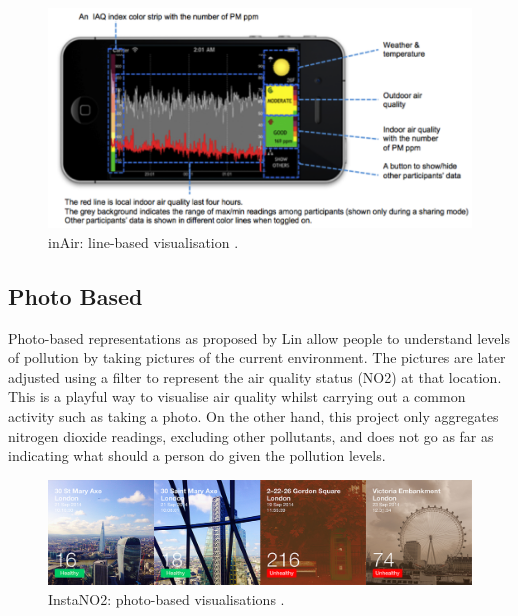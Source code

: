 \begin{figure}[H]
\begin{adjustbox}{width=1\textwidth,center=\textwidth}
  \centering
  \includegraphics[scale=1]{images/InAir.png}
\end{adjustbox}
  \caption[inAir project: line-based visualisations]{inAir: line-based visualisation \cite{Kim2013}.}
  \label{fig:line_based_inAir}
\end{figure}


\subsection{Photo Based}
Photo-based representations as proposed by Lin \cite{Lin2014} allow people to understand levels of pollution by taking pictures of the current environment. The pictures are later adjusted using a filter to represent the air quality status (NO2) at that location. This is a playful way to visualise air quality whilst carrying out a common activity such as taking a photo. On the other hand, this project only aggregates nitrogen dioxide readings, excluding other pollutants, and does not go as far as indicating what should a person do given the pollution levels.

\begin{figure}[H]
\begin{adjustbox}{width=.8\textwidth,center=\textwidth}
  \centering
  \includegraphics[scale=.4]{images/instaNO2.jpg}
\end{adjustbox}
  \caption[InstaNO2 project: photo-based visualisations]{InstaNO2: photo-based visualisations \cite{Lin2014}.}
  \label{fig:photo_based_instaNO2}
\end{figure}

